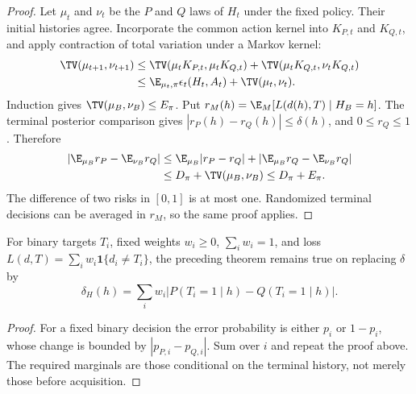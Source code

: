 \begin{proof}
Let $\mu_t$ and $\nu_t$ be the $P$ and $Q$ laws of $H_t$ under the fixed
policy.  Their initial histories agree.  Incorporate the common action
kernel into $K_{P,t}$ and $K_{Q,t}$, and apply contraction of total variation
under a Markov kernel:
\begin{align*}
 \TV(\mu_{t+1},\nu_{t+1})
 &\leq \TV(\mu_tK_{P,t},\mu_tK_{Q,t})
       +\TV(\mu_tK_{Q,t},\nu_tK_{Q,t})\\
 &\leq\E_{\mu_t,\pi}\epsilon_t(H_t,A_t)
       +\TV(\mu_t,\nu_t).
\end{align*}
Induction gives $\TV(\mu_B,\nu_B)\leq E_\pi$.
Put $r_M(h)=\E_M[L(d(h),T)\mid H_B=h]$.  The terminal posterior comparison
gives $|r_P(h)-r_Q(h)|\leq\delta(h)$, and $0\leq r_Q\leq1$.  Therefore
\begin{align*}
 |\E_{\mu_B}r_P-\E_{\nu_B}r_Q|
 &\leq\E_{\mu_B}|r_P-r_Q|
          +|\E_{\mu_B}r_Q-\E_{\nu_B}r_Q|\\
 &\leq D_\pi+\TV(\mu_B,\nu_B)\leq D_\pi+E_\pi.
\end{align*}
The difference of two risks in $[0,1]$ is at most one.  Randomized terminal
decisions can be averaged in $r_M$, so the same proof applies.
\end{proof}

\begin{proposition}
For binary targets $T_i$, fixed weights $w_i\geq0$, $\sum_iw_i=1$, and
loss $L(d,T)=\sum_iw_i\mathbf{1}\{d_i\ne T_i\}$, the preceding theorem
remains true on replacing $\delta$ by
\begin{equation}
 \delta_H(h)=\sum_iw_i
 \left|P(T_i=1\mid h)-Q(T_i=1\mid h)\right|.
 \label{eq:r3-terminal-marginals}
\end{equation}
\end{proposition}
\begin{proof}
For a fixed binary decision the error probability is either $p_i$ or
$1-p_i$, whose change is bounded by $|p_{P,i}-p_{Q,i}|$.  Sum over $i$ and
repeat the proof above.  The required marginals are those conditional on
the terminal history, not merely those before acquisition.
\end{proof}

